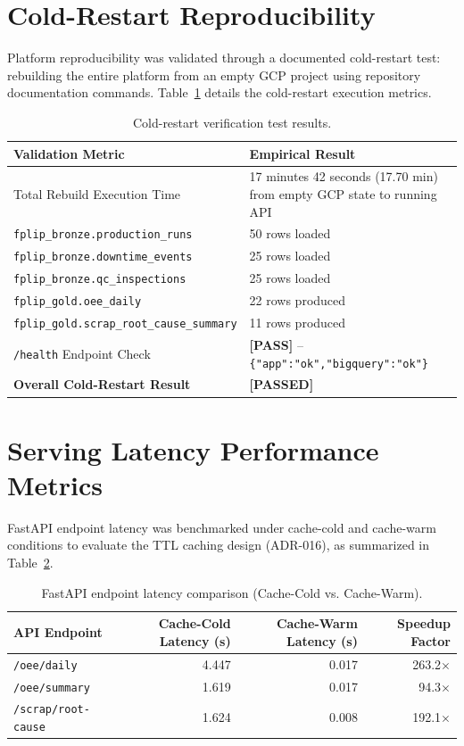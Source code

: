 \documentclass[12pt, a4paper]{report}
\begin{document}
\section{Cold-Restart Reproducibility}
Platform reproducibility was validated through a documented cold-restart test: rebuilding the entire platform from an empty GCP project using repository documentation commands. Table~\ref{tab:cold-restart} details the cold-restart execution metrics.

\begin{table}[h]
\centering
\begin{tabularx}{\textwidth}{l X}
\toprule
\textbf{\color{primary}Validation Metric} & \textbf{\color{primary}Empirical Result} \\
\midrule
Total Rebuild Execution Time & 17 minutes 42 seconds (17.70 min) from empty GCP state to running API \\
\texttt{fplip\_bronze.production\_runs} & 50 rows loaded \\
\texttt{fplip\_bronze.downtime\_events} & 25 rows loaded \\
\texttt{fplip\_bronze.qc\_inspections} & 25 rows loaded \\
\texttt{fplip\_gold.oee\_daily} & 22 rows produced \\
\texttt{fplip\_gold.scrap\_root\_cause\_summary} & 11 rows produced \\
\texttt{/health} Endpoint Check & \textbf{[PASS]} -- \texttt{\{"app":"ok","bigquery":"ok"\}} \\
\textbf{Overall Cold-Restart Result} & \textbf{[PASSED]} \\
\bottomrule
\end{tabularx}
\caption{Cold-restart verification test results.}
\label{tab:cold-restart}
\end{table}

\section{Serving Latency Performance Metrics}
FastAPI endpoint latency was benchmarked under cache-cold and cache-warm conditions to evaluate the TTL caching design (ADR-016), as summarized in Table~\ref{tab:latency}.

\begin{table}[h]
\centering
\begin{tabularx}{\textwidth}{l r r r}
\toprule
\textbf{\color{primary}API Endpoint} & \textbf{\color{primary}Cache-Cold Latency (s)} & \textbf{\color{primary}Cache-Warm Latency (s)} & \textbf{\color{primary}Speedup Factor} \\
\midrule
\texttt{/oee/daily} & 4.447 & 0.017 & 263.2$\times$ \\
\texttt{/oee/summary} & 1.619 & 0.017 & 94.3$\times$ \\
\texttt{/scrap/root-cause} & 1.624 & 0.008 & 192.1$\times$ \\
\bottomrule
\end{tabularx}
\caption{FastAPI endpoint latency comparison (Cache-Cold vs. Cache-Warm).}
\label{tab:latency}
\end{table}
\end{document}
